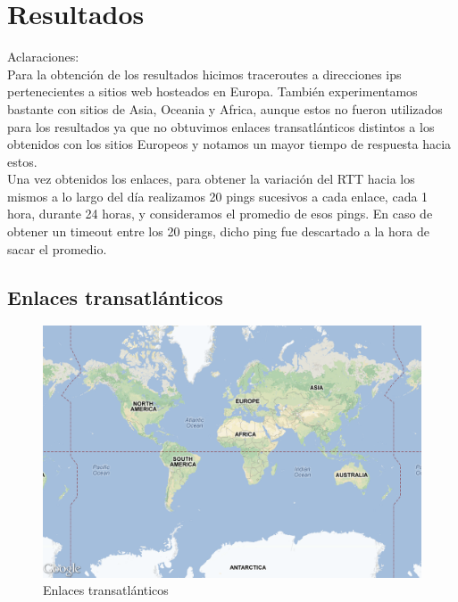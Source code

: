 \section{Resultados}

Aclaraciones:	\\
\indent	Para la obtención de los resultados hicimos traceroutes a direcciones ips pertenecientes a sitios web hosteados en Europa. También experimentamos bastante con sitios de Asia, Oceania y Africa, aunque estos no fueron utilizados para los resultados ya que no obtuvimos enlaces transatlánticos distintos a los obtenidos con los sitios Europeos y notamos un mayor tiempo de respuesta hacia estos.	\\
\indent	Una vez obtenidos los enlaces, para obtener la variación del RTT hacia los mismos a lo largo del día realizamos 20 pings sucesivos a cada enlace, cada 1 hora, durante 24 horas, y consideramos el promedio de esos pings. En caso de obtener un timeout entre los 20 pings, dicho ping fue descartado a la hora de sacar el promedio.

\subsection{Enlaces transatlánticos}


\begin{figure}[H]
\begin{center}
\includegraphics[width=17cm]{enlaces.png}
\end{center}
\caption{Enlaces transatlánticos} \label{figura1}
\end{figure}

